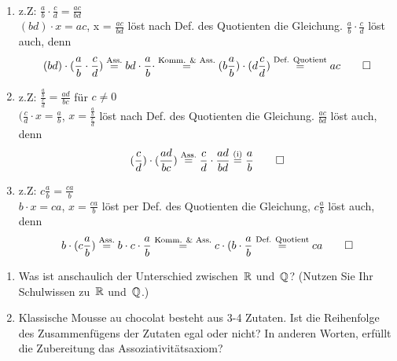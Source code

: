 \bigskip

\begin{comment}
\newcommand\Asseq{\stackrel{\mathclap{\normalfont\fontsize{4}\mbox{Ass.}}}{=}}
\newcommand\KommAsseq{\stackrel{\mathclap{\normalfont\fontsize{4}\mbox{Komm. & Ass.}}}{=}}
\newcommand\Defeq{\stackrel{\mathclap{\normalfont\fontsize{4}\mbox{Def. Quotient}}}{=}}
\newcommand\ieq{\stackrel{\mathclap{\normalfont\fontsize{4}\mbox{(i)}}}{=}}
\end{comment}


\newcommand\Asseq{\stackrel{\text{Ass.}}{=}}
\newcommand\KommAsseq{\stackrel{\text{Komm. \& Ass.}}{=}}
\newcommand\Defeq{\stackrel{\text{Def. Quotient}}{=}}
\newcommand\ieq{\stackrel{\text{(i)}}{=}}

\begin{lsg}
\mbox{ }
\begin{enumerate}[label=$\mathrm{(\roman*)}$, ref=$\mathrm{\roman*}$]
\item z.Z: $\frac{a}{b} \cdot \frac{c}{d} = \frac{ac}{bd}$\\
$(bd) \cdot x = ac$, x = $\frac{ac}{bd}$ l\"ost nach Def. des Quotienten die Gleichung.
$\frac{a}{b} \cdot \frac{c}{d}$ l\"ost auch, denn 
\[
(bd) \cdot (\frac{a}{b} \cdot \frac{c}{d}) \Asseq 
bd \cdot \frac{a}{b} \cdot \KommAsseq (b \frac{a}{b}) \cdot (d\frac{c}{d}) \Defeq ac \qed
\]
\item z.Z: $\frac{\frac{a}{b}}{\frac{c}{d}} = \frac{ad}{bc}$ f\"ur $c\not=0$\\
$(\frac{c}{d} \cdot x = \frac{a}{b}$, $x = \frac{\frac{a}{b}}{\frac{c}{d}}$ l\"ost nach Def. des Quotienten die Gleichung. $\frac{ac}{bd}$ l\"ost auch, denn
\[
(\frac{c}{d}) \cdot (\frac{ad}{bc}) \Asseq 
\frac{c}{d} \cdot \frac{ad}{bd} \ieq \frac{a}{b} \qed
\]
\item z.Z: $c\frac{a}{b} = \frac{ca}{b}$\\
$b \cdot x = ca$, $x = \frac{ca}{b}$ l\"ost per Def. des Quotienten die Gleichung, $c\frac{a}{b}$ l\"ost auch, denn
\[
b \cdot (c\frac{a}{b}) \Asseq 
b \cdot c \cdot \frac{a}{b} \KommAsseq c \cdot (b \cdot \frac{a}{b} \Defeq ca \qed
\]
\end{enumerate}
\end{lsg}

\bigskip


\begin{aufg}[4 Punkte]
\begin{enumerate}[label=$\mathrm{(\roman*)}$, ref=$\mathrm{\roman*}$]
\item Was ist anschaulich der Unterschied zwischen~$\mathbb{R}$ und~$\mathbb{Q}$? (Nutzen Sie Ihr Schulwissen zu~$\mathbb{R}$ und~$\mathbb{Q}$.)
\item Klassische Mousse au chocolat besteht aus 3-4 Zutaten. Ist die Reihenfolge des Zusammenf\"ugens der Zutaten egal oder nicht? In anderen Worten, erf\"ullt die Zubereitung das Assoziativit\"atsaxiom?
\end{enumerate}
\end{aufg}
 
